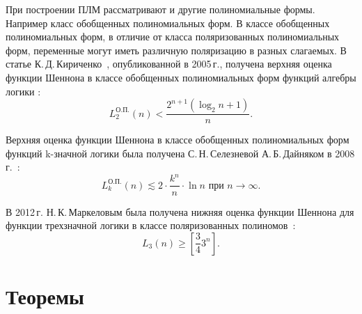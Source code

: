 \documentclass[a4paper, 14pt]{extarticle}
\begin{document}
При построении ПЛМ рассматривают и другие полиномиальные формы. Например класс обобщенных полиномиальных форм.
В классе обобщенных полиномиальных форм, в отличие от класса поляризованных полиномиальных форм, переменные могут иметь
различную поляризацию в разных слагаемых. В статье К.\,Д.\,Кириченко~\cite{kk05}, опубликованной в 2005\,г., получена верхняя оценка
функции Шеннона в классе обобщенных полиномиальных форм функций алгебры логики :
$$
L^{\text{О.П.}}_2(n) < \frac{2 ^ {n + 1}(\log_2n+1)}{n}.
$$

Верхняя оценка функции Шеннона в классе обобщенных полиномиальных форм функций k\nobreakdash-значной логики была получена
С.\,Н.\,Селезневой А.\,Б.\,Дайняком в 2008\,г.~\cite{sd08}:
$$
L^{\text{О.П.}}_k(n) \lesssim 2\cdot\frac{k ^ n}{n}\cdot \ln n \text{ при } n \rightarrow \infty.
$$

В 2012\,г. Н.\,К.\,Маркеловым была получена нижняя оценка функции Шеннона для функции трехзначной логики в классе
поляризованных полиномов~\cite{mn12}:
$$
L_3(n) \geqslant \left[\frac{3}{4}3^n\right].
$$

\section{Теоремы}
\end{document}
